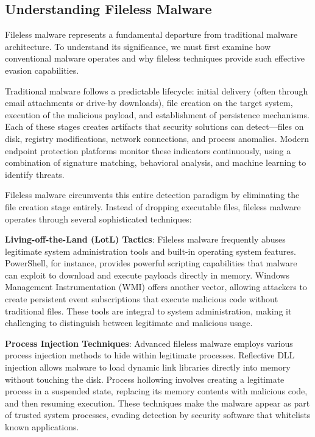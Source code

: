 \subsection{Understanding Fileless Malware}
\label{subsec:fileless_malware}

Fileless malware represents a fundamental departure from traditional malware architecture. To understand its significance, we must first examine how conventional malware operates and why fileless techniques provide such effective evasion capabilities.

Traditional malware follows a predictable lifecycle: initial delivery (often through email attachments or drive-by downloads), file creation on the target system, execution of the malicious payload, and establishment of persistence mechanisms. Each of these stages creates artifacts that security solutions can detect—files on disk, registry modifications, network connections, and process anomalies. Modern endpoint protection platforms monitor these indicators continuously, using a combination of signature matching, behavioral analysis, and machine learning to identify threats.

Fileless malware circumvents this entire detection paradigm by eliminating the file creation stage entirely. Instead of dropping executable files, fileless malware operates through several sophisticated techniques:

\textbf{Living-off-the-Land (LotL) Tactics}: Fileless malware frequently abuses legitimate system administration tools and built-in operating system features. PowerShell, for instance, provides powerful scripting capabilities that malware can exploit to download and execute payloads directly in memory. Windows Management Instrumentation (WMI) offers another vector, allowing attackers to create persistent event subscriptions that execute malicious code without traditional files. These tools are integral to system administration, making it challenging to distinguish between legitimate and malicious usage.

\textbf{Process Injection Techniques}: Advanced fileless malware employs various process injection methods to hide within legitimate processes. Reflective DLL injection allows malware to load dynamic link libraries directly into memory without touching the disk. Process hollowing involves creating a legitimate process in a suspended state, replacing its memory contents with malicious code, and then resuming execution. These techniques make the malware appear as part of trusted system processes, evading detection by security software that whitelists known applications.

